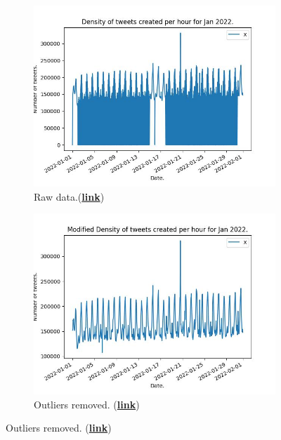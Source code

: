 \documentclass[10pt]{article}
\begin{document}
\begin{figure}[h!]
    \center
    \begin{subfigure}[b]{0.3\textwidth}
        \includegraphics[scale=0.34]{figures/JanAllraw.jpeg}
        \caption{Raw
        data.(\href{https://github.com/JamesZor/data-WranglingProject/blob/main/figures/JanAllraw.jpeg}{\color{blue}\textbf{link}})}
        \label{fig:1a}
    \end{subfigure}
    \begin{subfigure}[b]{0.3\textwidth}
        \includegraphics[scale=0.34]{figures/JanAllmod.jpeg}
        \caption{Outliers removed. (\href{https://github.com/JamesZor/data-WranglingProject/blob/main/figures/JanAllmod.jpeg}{\color{blue}\textbf{link}})}

\end{subfigure}
\end{figure}
\end{document}

